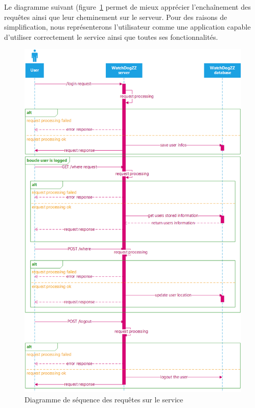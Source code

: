 Le diagramme suivant (figure~\ref{servicereq} permet de mieux apprécier l'enchaînement des requêtes ainsi que leur cheminement sur le serveur. Pour des raisons de simplification, nous représenterons l'utilisateur comme une application capable d'utiliser correctement le service ainsi que toutes ses fonctionnalités.

\begin{figure}[H]
    \centering
    \includegraphics[width=\textwidth]{./img/server-requests.png}
    \caption{Diagramme de séquence des requêtes sur le service}
    \label{servicereq}
\end{figure}